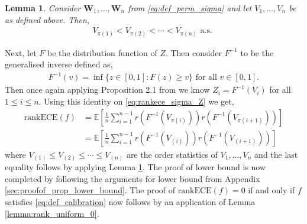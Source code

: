 \documentclass[11pt]{article}
\numberwithin{equation}{section}
\newtheorem{lemma}{Lemma}[section]
\theoremstyle{definition}
\newcommand{\E}{\mathbb{E}}
\newcommand{\bW}{\bm{W}}
\newcommand{\rankECE}{\mathrm{rankECE}}
\begin{document}
\begin{lemma}\label{lemma:V_sigma_rank}
    Consider $\bW_1,\ldots, \bW_n$ from \eqref{eq:def_perm_sigma} and let $V_1,\ldots, V_n$ be as defined above. Then,
    \begin{align*}
        V_{\pi(1)}<V_{\pi(2)}<\cdots<V_{\pi(n)} \text{ a.s. }
    \end{align*}
\end{lemma}
Next, let $F$ be the distribution function of $Z$. Then consider $F^{-1}$ to be the generalised inverse defined as,
\begin{align*}
    F^{-1}(v) = \inf\{z\in [0,1]: F(z)\geq v\} \text{ for all }v\in [0,1]. 
\end{align*}
Then once again applying Proposition 2.1 from \cite{ruschendorf2009distributional} we know $Z_i = F^{-1}(V_i)$ for all $1\leq i\leq n$. Using this identity on \eqref{eq:rankece_sigma_Z} we get,
\begin{align}
    \rankECE(f) 
    & = \E\left[\frac{1}{n}\sum_{i=1}^{n-1}r\left(F^{-1}(V_{\pi(i)})\right)r\left(F^{-1}(V_{\pi(i+1)})\right)\right]\nonumber\\
    & = \E\left[\frac{1}{n}\sum_{i=1}^{n-1}r\left(F^{-1}(V_{(i)})\right)r\left(F^{-1}(V_{(i+1)})\right)\right]\label{eq:rank_V}
\end{align}
where $V_{(1)}\leq V_{(2)}\leq\cdots\leq V_{(n)}$ are the order statistics of $V_1,\ldots,V_n$ and the last equality follows by applying Lemma \ref{lemma:V_sigma_rank}. The proof of lower bound is now completed by following the arguments for lower bound from Appendix \ref{sec:proofof_prop_lower_bound}. The proof of $\rankECE(f) = 0$ if and only if $f$ satisfies \eqref{eq:def_calibration} now follows by an application of Lemma \ref{lemma:rank_uniform_0}.
\end{document}
